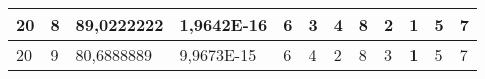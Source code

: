 \documentclass[conference]{IEEEtran}
\begin{document}
\begin{table*}[]
\begin{tabular}{|llll|llllllll|}
\multicolumn{1}{|l|}{20}                                                    & \multicolumn{1}{l|}{8}                                                        & \multicolumn{1}{l|}{89,0222222}                                                   & 1,9642E-16                     & \multicolumn{1}{l|}{6}                                                  & \multicolumn{1}{l|}{3}                                                  & \multicolumn{1}{l|}{4}                                                  & \multicolumn{1}{l|}{8}                                                  & \multicolumn{1}{l|}{2}                                                  & \multicolumn{1}{l|}{\textbf{1}}                                         & \multicolumn{1}{l|}{5}                                                  & 7                          \\ \hline
\multicolumn{1}{|l|}{20}                                                    & \multicolumn{1}{l|}{9}                                                        & \multicolumn{1}{l|}{80,6888889}                                                   & 9,9673E-15                     & \multicolumn{1}{l|}{6}                                                  & \multicolumn{1}{l|}{4}                                                  & \multicolumn{1}{l|}{2}                                                  & \multicolumn{1}{l|}{8}                                                  & \multicolumn{1}{l|}{3}                                                  & \multicolumn{1}{l|}{\textbf{1}}                                         & \multicolumn{1}{l|}{5}                                                  & 7                          \\ \hline
\end{tabular}
\end{table*}
\end{document}
